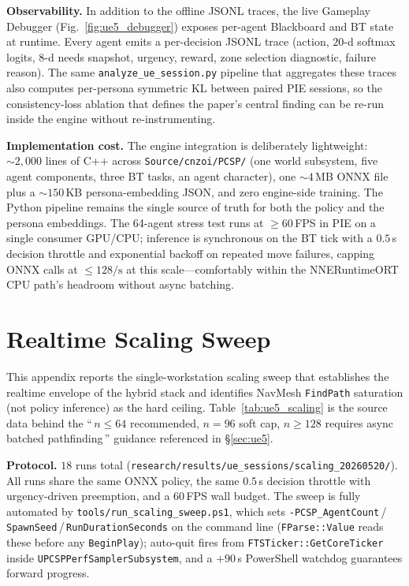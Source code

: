 \documentclass[conference]{IEEEtran}
\begin{document}
\textbf{Observability.}
In addition to the offline JSONL traces, the live Gameplay Debugger
(Fig.~\ref{fig:ue5_debugger}) exposes per-agent Blackboard and BT state
at runtime. Every agent emits a per-decision JSONL trace (action,
$20$-d softmax logits, $8$-d needs snapshot, urgency, reward, zone
selection diagnostic, failure reason). The same
\texttt{analyze\_ue\_session.py} pipeline that aggregates these traces
also computes per-persona symmetric KL between paired PIE sessions, so
the consistency-loss ablation that defines the paper's central finding
can be re-run inside the engine without re-instrumenting.

\textbf{Implementation cost.}
The engine integration is deliberately lightweight: $\sim\!2{,}000$
lines of C++ across \texttt{Source/cnzoi/PCSP/} (one world subsystem,
five agent components, three BT tasks, an agent character), one
$\sim\!4$\,MB ONNX file plus a $\sim\!150$\,KB persona-embedding JSON,
and zero engine-side training. The Python pipeline remains the single
source of truth for both the policy and the persona embeddings. The
64-agent stress test runs at $\geq\!60$\,FPS in PIE on a single consumer
GPU/CPU; inference is synchronous on the BT tick with a $0.5$\,s
decision throttle and exponential backoff on repeated move failures,
capping ONNX calls at $\leq\!128/\text{s}$ at this scale---comfortably
within the NNERuntimeORT CPU path's headroom without async batching.

\section{Realtime Scaling Sweep}
\label{app:ue5_scaling}

This appendix reports the single-workstation scaling sweep that
establishes the realtime envelope of the hybrid stack and identifies
NavMesh \texttt{FindPath} saturation (not policy inference) as the hard
ceiling. Table~\ref{tab:ue5_scaling} is the source data behind the
``\,$n\!\leq\!64$ recommended, $n\!=\!96$ soft cap, $n\!\geq\!128$
requires async batched pathfinding\,'' guidance referenced in
\S\ref{sec:ue5}.

\textbf{Protocol.}
$18$ runs total
(\texttt{research/\allowbreak results/\allowbreak ue\_sessions/\allowbreak scaling\_20260520/}).
All runs share the same ONNX policy, the same $0.5$\,s decision throttle
with urgency-driven preemption, and a $60$\,FPS wall budget.
The sweep is fully automated by \texttt{tools/run\_scaling\_sweep.ps1},
which sets \texttt{-PCSP\_AgentCount}\,/\,\allowbreak\texttt{SpawnSeed}\,/\,\allowbreak\texttt{RunDurationSeconds}
on the command line (\texttt{FParse::Value} reads these before any
\texttt{BeginPlay}); auto-quit fires from \texttt{FTSTicker::GetCoreTicker}
inside \texttt{UPCSPPerfSamplerSubsystem}, and a $+90$\,s PowerShell
watchdog guarantees forward progress.
\end{document}

